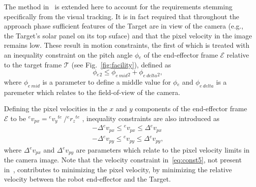 The method in~\cite{lampariello2013generating} is extended here to account for the requirements stemming specifically from the visual tracking. It is in fact required that throughout the approach phase sufficient features of the Target are in view of the camera (e.g., the Target's solar panel on its top suface) and that the pixel velocity in the image remains low. These result in motion constraints, the first of which is treated with an inequality constraint on the pitch angle $\phi{}_{e}$ of the end-effector frame $\mathcal{E}$  relative to the target frame $\mathcal{T}$ (see Fig.~\ref{fig:facility}), defined as
\begin{equation}
\phi{}_{e}{}_2 \leq \phi_{e \: mid}{}_2 + \phi_{e \: delta}{}_2,
\end{equation}
where $\phi_{e \: mid}$ is a parameter to define a middle value for $\phi{}_{e}$ and $\phi_{e \: delta}$ is a paremeter which relates to the field-of-view of the camera. 

Defining the pixel velocities in the $x$ and $y$ components of the end-effector frame $\mathcal{E}$ to be ${}^{e}v{}_{px}={}^{e}v{}_{y}{}^{te}\ / {}^{e}r{}_{z}{}^{te}$ , inequality constraints are also introduced as
\begin{eqnarray}
-\Delta {}^{e}v{}_{px}  \leq {}^{e}v{}_{px} \leq \Delta {}^{e}v{}_{px} \\ 
-\Delta {}^{e}v{}_{py}  \leq {}^{e}v{}_{py} \leq \Delta {}^{e}v{}_{py},
\end{eqnarray}
where $\Delta {}^{e}v{}_{px}$ and $\Delta {}^{e}v{}_{py}$ are parameters which relate to the pixel velocity limits in the camera image. Note that the velocity constraint in~\ref{eq:const5}, not present in~\cite{lampariello2013generating}, contributes to minimizing the pixel velocity, by minimizing the relative velocity between the robot end-effector and the Target.

